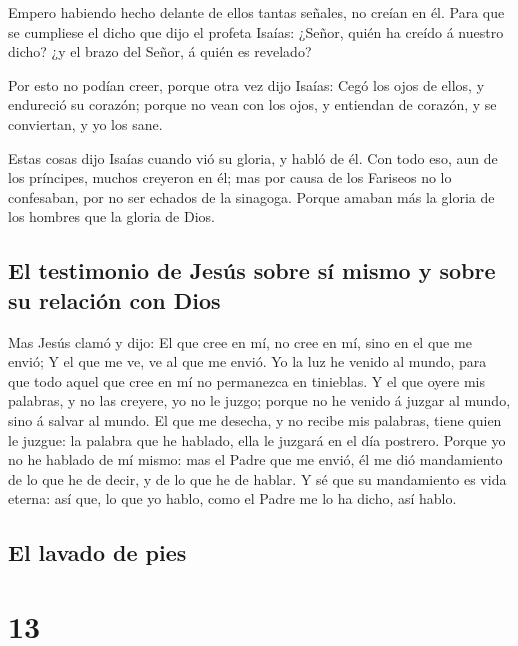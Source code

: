  Empero habiendo hecho delante de ellos tantas señales,
no creían en él.  Para que se cumpliese el dicho que dijo
el profeta Isaías: ¿Señor, quién ha creído á nuestro dicho? ¿y el brazo
del Señor, á quién es revelado?

 Por esto no podían creer, porque otra vez dijo Isaías:
 Cegó los ojos de ellos, y endureció su corazón; porque
no vean con los ojos, y entiendan de corazón, y se conviertan, y yo los
sane.

 Estas cosas dijo Isaías cuando vió su gloria, y habló de
él.  Con todo eso, aun de los príncipes, muchos creyeron
en él; mas por causa de los Fariseos no lo confesaban, por no ser
echados de la sinagoga.  Porque amaban más la gloria de
los hombres que la gloria de Dios.

\hypertarget{el-testimonio-de-jesuxfas-sobre-suxed-mismo-y-sobre-su-relaciuxf3n-con-dios}{%
\subsection{El testimonio de Jesús sobre sí mismo y sobre su relación
con
Dios}\label{el-testimonio-de-jesuxfas-sobre-suxed-mismo-y-sobre-su-relaciuxf3n-con-dios}}

 Mas Jesús clamó y dijo: El que cree en mí, no cree en
mí, sino en el que me envió;  Y el que me ve, ve al que
me envió.  Yo la luz he venido al mundo, para que todo
aquel que cree en mí no permanezca en tinieblas.  Y el
que oyere mis palabras, y no las creyere, yo no le juzgo; porque no he
venido á juzgar al mundo, sino á salvar al mundo.  El que
me desecha, y no recibe mis palabras, tiene quien le juzgue: la palabra
que he hablado, ella le juzgará en el día postrero. 
Porque yo no he hablado de mí mismo: mas el Padre que me envió, él me
dió mandamiento de lo que he de decir, y de lo que he de hablar.
 Y sé que su mandamiento es vida eterna: así que, lo que
yo hablo, como el Padre me lo ha dicho, así hablo.

\hypertarget{el-lavado-de-pies}{%
\subsection{El lavado de pies}\label{el-lavado-de-pies}}

\hypertarget{section-43-13}{%
\section{13}\label{section-43-13}}

